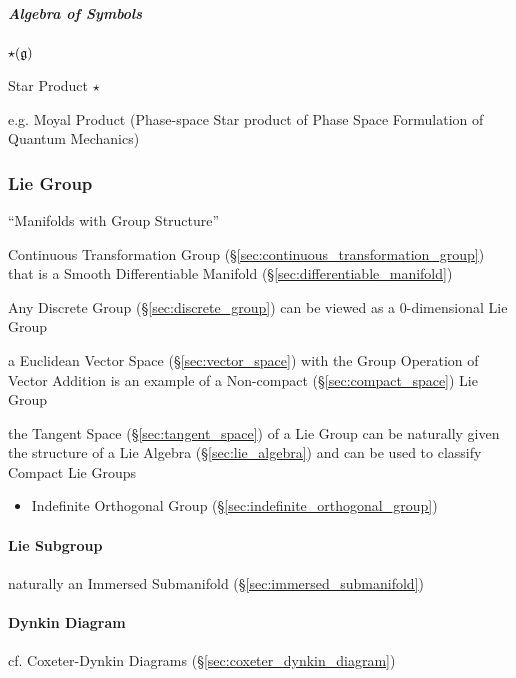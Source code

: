 \subparagraph{Algebra of Symbols}\label{sec:symbol_algebra}\hfill

$\star(\mathfrak{g})$

Star Product $\star$

e.g. Moyal Product (Phase-space Star product of Phase Space Formulation of
Quantum Mechanics)



\subsubsection{Lie Group}\label{sec:lie_group}

``Manifolds with Group Structure''

Continuous Transformation Group
(\S\ref{sec:continuous_transformation_group}) that is a Smooth
Differentiable Manifold (\S\ref{sec:differentiable_manifold})

Any Discrete Group (\S\ref{sec:discrete_group}) can be viewed as a
$0$-dimensional Lie Group %

a Euclidean Vector Space (\S\ref{sec:vector_space}) with the Group Operation of
Vector Addition is an example of a Non-compact (\S\ref{sec:compact_space}) Lie
Group

the Tangent Space (\S\ref{sec:tangent_space}) of a Lie Group can be naturally
given the structure of a Lie Algebra (\S\ref{sec:lie_algebra}) and can be used
to classify Compact Lie Groups

\begin{itemize}
  \item Indefinite Orthogonal Group (\S\ref{sec:indefinite_orthogonal_group})
\end{itemize}



\paragraph{Lie Subgroup}\label{sec:lie_subgroup}\hfill

naturally an Immersed Submanifold (\S\ref{sec:immersed_submanifold})



\paragraph{Dynkin Diagram}\label{sec:dynkin_diagram}\hfill

cf. Coxeter-Dynkin Diagrams (\S\ref{sec:coxeter_dynkin_diagram})



